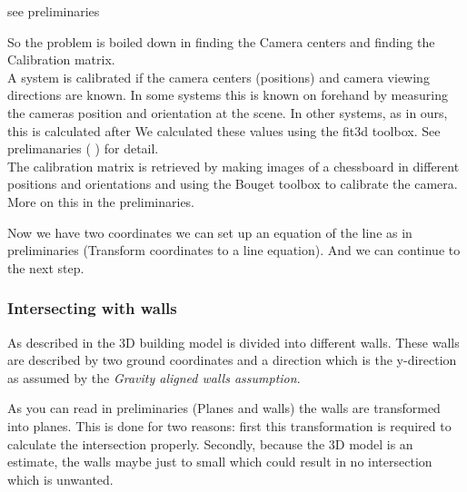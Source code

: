 	see preliminaries %

	So the problem is boiled down in finding the Camera centers and finding the
	Calibration matrix.\\

	A system is calibrated if the camera centers (positions) and camera viewing directions are
	known. In some systems this is known on forehand by measuring the cameras position and
	orientation at the scene. In other systems, as in ours, this is calculated 
	after
	We calculated these values using the fit3d toolbox.%
	 See prelimanaries (%
	) for detail.\\  

	The calibration matrix is retrieved by making images of a chessboard in
	different positions and orientations and using the Bouget toolbox to calibrate
	the camera. More on this in the preliminaries.

	Now we have two coordinates we can set up an equation of the line as in
	preliminaries (Transform coordinates to a line equation). And we can continue to
	the next step.

	\subsubsection{Intersecting with walls}


	As described in %
	 the 3D building model is divided into different walls. These walls are
	 described by two ground coordinates and a direction which is the y-direction as
	 assumed by the \emph{Gravity aligned walls assumption}.

	As you can read in preliminaries (Planes and walls) the walls are transformed
	into planes.  This is done for two reasons: first this transformation is required to calculate the intersection properly.
	Secondly, because the 3D model is an estimate, the walls maybe just
	to small which could %
	result in no intersection which is unwanted.


